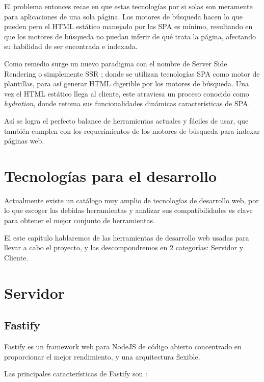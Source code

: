 El problema entonces recae en que estas tecnologías por si solas son meramente para aplicaciones de una sola página. Los motores de búsqueda hacen lo que pueden pero el HTML estático manejado por las SPA es mínimo, resultando en que los motores de búsqueda no puedan inferir de qué trata la página, afectando su habilidad de ser encontrada e indexada.

Como remedio surge un nuevo paradigma con el nombre de Server Side Rendering o simplemente SSR \cite{ServerSideRendering}; donde se utilizan  tecnologías SPA como motor de plantillas, para así generar HTML digerible por los motores de búsqueda. Una vez el HTML estático llega al cliente, este atraviesa un proceso conocido como \textit{hydration}, donde retoma sus funcionalidades dinámicas características de SPA.

Así se logra el perfecto balance de herramientas actuales y fáciles de usar, que también cumplen con los requerimientos de los motores de búsqueda para indexar páginas web.

\section{Tecnologías para el desarrollo}

Actualmente existe un catálogo muy amplio de tecnologías de desarrollo web, por lo que escoger las debidas herramientas y analizar sus compatibilidades es clave para obtener el mejor conjunto de herramientas.

El este capítulo hablaremos de las herramientas de desarrollo web usadas para llevar a cabo el proyecto, y las descompondremos en 2 categorías: Servidor y Cliente.

\section{Servidor}

\subsection{Fastify}

Fastify es un framework web para NodeJS de código abierto concentrado en proporcionar el mejor rendimiento, y una arquitectura flexible. 

Las principales características de Fastify son \cite{FastifyCoreFeatures}:

